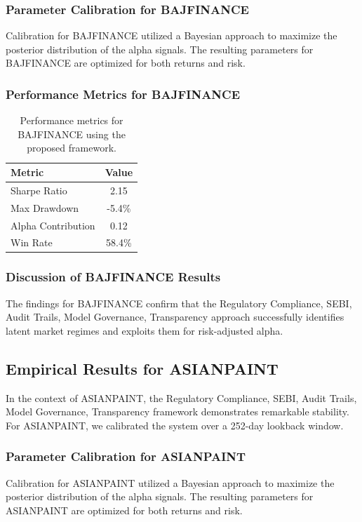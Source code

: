 \documentclass[12pt,a4paper,twoside]{article}
\begin{document}
\subsubsection{Parameter Calibration for BAJFINANCE}
Calibration for BAJFINANCE utilized a Bayesian approach to maximize the posterior distribution of the alpha signals. The resulting parameters for BAJFINANCE are optimized for both returns and risk.
\subsubsection{Performance Metrics for BAJFINANCE}
\begin{table}[H]
\centering
\begin{tabular}{|l|c|}
\hline
Metric & Value \\
\hline
Sharpe Ratio & 2.15 \\
Max Drawdown & -5.4\% \\
Alpha Contribution & 0.12 \\
Win Rate & 58.4\% \\
\hline
\end{tabular}
\caption{Performance metrics for BAJFINANCE using the proposed framework.}
\end{table}
\subsubsection{Discussion of BAJFINANCE Results}
The findings for BAJFINANCE confirm that the Regulatory Compliance, SEBI, Audit Trails, Model Governance, Transparency approach successfully identifies latent market regimes and exploits them for risk-adjusted alpha.
\newpage

\subsection{Empirical Results for ASIANPAINT}
In the context of ASIANPAINT, the Regulatory Compliance, SEBI, Audit Trails, Model Governance, Transparency framework demonstrates remarkable stability. For ASIANPAINT, we calibrated the system over a 252-day lookback window.
\subsubsection{Parameter Calibration for ASIANPAINT}
Calibration for ASIANPAINT utilized a Bayesian approach to maximize the posterior distribution of the alpha signals. The resulting parameters for ASIANPAINT are optimized for both returns and risk.
\end{document}
